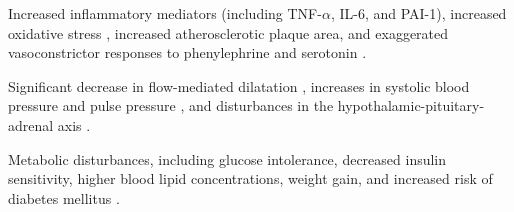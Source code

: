\documentclass[11pt]{article}
\begin{document}
\begin{enumerate*}[{[1)]}]
    \item Increased inflammatory mediators (including TNF-$\alpha$, IL-6, and PAI-1), increased oxidative stress \citep{ostro2014chronic, ruckerl2014associations, sorensen2003personal}, increased atherosclerotic plaque area, and exaggerated vasoconstrictor responses to phenylephrine and serotonin \citep{sun2005long}.
    \item Significant decrease in flow-mediated dilatation \citep{krishnan2012vascular, wilker2014relation}, increases in systolic blood pressure and pulse pressure \citep{auchincloss2008associations, fuks2014arterial, fuks2011long}, and disturbances in the hypothalamic-pituitary-adrenal axis \citep{thomson2013mapping}.
    \item  Metabolic disturbances, including glucose intolerance, decreased insulin sensitivity, higher blood lipid concentrations, weight gain, and increased risk of diabetes mellitus \citep{wei2016chronic, chen2016ambient, wolf2016association}.
\end{enumerate*}
\end{document}
